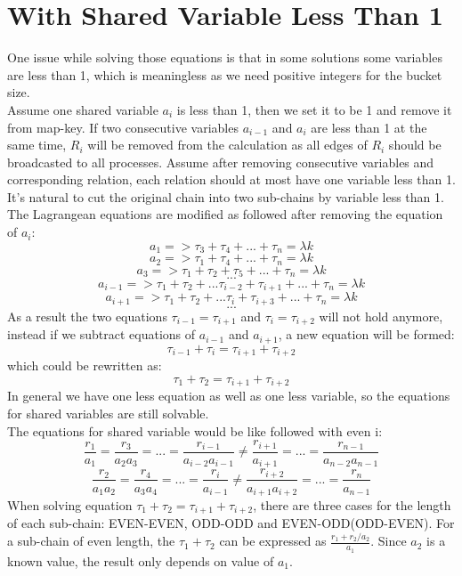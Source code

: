 \section{With Shared Variable Less Than 1}
One issue while solving those equations is that in some solutions some variables are less than 1, which is meaningless as we need positive integers for the bucket size.\\
Assume one shared variable $a_i$ is less than 1, then we set it to be 1 and remove it from map-key. If two consecutive variables $a_{i-1}$ and $a_{i}$ are less than 1 at the same time, $R_i$ will be removed from the calculation as all edges of $R_i$ should be broadcasted to all processes. Assume after removing consecutive variables and corresponding relation, each relation should at most have one variable less than 1. It's natural to cut the original chain into two sub-chains by variable less than 1. The Lagrangean equations are modified as followed after removing the equation of $a_i$:
$$a_1 => \tau_3 + \tau_4 + ... + \tau_n = \lambda k$$
$$a_2 => \tau_1 + \tau_4 + ... + \tau_n = \lambda k$$
$$a_3 => \tau_1 + \tau_2 + \tau_5 + ... + \tau_n = \lambda k$$
$$...$$
$$a_{i-1} => \tau_1 + \tau_2 + ... \tau_{i-2} + \tau_{i+1} + ... + \tau_n = \lambda k$$
$$a_{i+1} => \tau_1 + \tau_2 + ... \tau_{i} + \tau_{i+3} + ... + \tau_n = \lambda k$$
$$...$$
As a result the two equations $\tau_{i-1} = \tau_{i+1}$ and $\tau_{i} = \tau_{i+2}$ will not hold anymore, instead if we subtract equations of $a_{i-1}$ and $a_{i+1}$, a new equation will be formed:
$$\tau_{i-1} + \tau_{i} = \tau_{i+1} + \tau_{i+2}$$
which could be rewritten as:
$$\tau_{1} + \tau_{2} = \tau_{i+1} + \tau_{i+2}$$
In general we have one less equation as well as one less variable, so the equations for shared variables are still solvable.\\
The equations for shared variable would be like followed with even i:
$$\frac{r_1}{a_1} = \frac{r_3}{a_2a_3} = ... =  \frac{r_{i-1}}{a_{i-2}a_{i-1}} \neq \frac{r_{i+1}}{a_{i+1}} = ... = \frac{r_{n-1}}{a_{n-2}a_{n-1}}$$
$$\frac{r_2}{a_1a_2} = \frac{r_4}{a_3a_4} = ... = \frac{r_i}{a_{i-1}} \neq \frac{r_{i+2}}{a_{i+1}a_{i+2}} = ... = \frac{r_{n}}{a_{n-1}}$$
When solving equation $\tau_{1} + \tau_{2} = \tau_{i+1} + \tau_{i+2}$, there are three cases for the length of each sub-chain: EVEN-EVEN, ODD-ODD and EVEN-ODD(ODD-EVEN).
For a sub-chain of even length, the $\tau_{1} + \tau_{2}$ can be expressed as $\frac{r_1+r_2/a_2}{a_1}$. Since $a_2$ is a known value, the result only depends on value of $a_1$.\\
